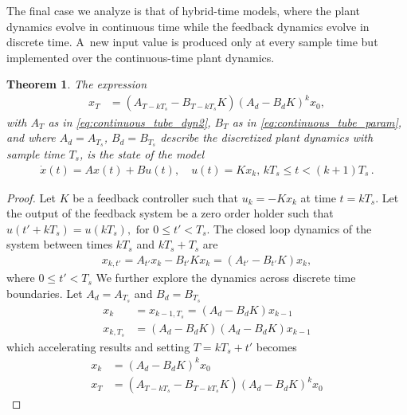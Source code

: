 \documentclass[twocolumn]{autart}    %
\newcommand{\mat}[1]{{#1}}
\renewcommand{\vec}[1]{{#1}}
\newtheorem{theorem}{Theorem}
\newtheorem{proof}{Proof}
\renewcommand{\note}[1]{\textcolor{red}{[#1]}}
\begin{document}
The final case we analyze is that of hybrid-time models, where the plant
dynamics evolve in continuous time while the feedback dynamics evolve in
discrete time.  A~new input value is produced only at every sample time but
implemented over the continuous-time plant dynamics.
%
\begin{theorem}
The expression
%
 \begin{align}
 \vec{x}_{T} &= (\mat{A}_{T-kT_s}-\mat{B}_{T-kT_s}\mat{K}) (\mat{A}_d-\mat{B}_d\mat{K})^k\vec{x}_0, 
 \label{eq:cyber_feedback}
 \end{align}
%
with $\mat{A}_T$ as in \eqref{eq:continuous_tube_dyn2}, $\mat{B}_T$ as in
\eqref{eq:continuous_tube_param}, and where $\mat{A}_d=\mat{A}_{T_s}$,
$\mat{B}_d=\mat{B}_{T_s}$ describe the discretized plant dynamics with
sample time $T_s$, is the state of the model
%
\begin{align*}
 \dot{\vec{x}}(t) = \mat{A}\vec{x}(t)+\mat{B}\vec{u}(t), \quad 
 \vec{u}(t)=\mat{K}\vec{x}_k,  \,
 kT_s \leq t < (k+1)T_s \,. 
\end{align*}
%
\end{theorem}
\begin{proof}
%
Let $\mat{K}$ be a feedback controller such that
$\vec{u}_k=-\mat{K}\vec{x}_k$ at time $t=kT_s$.  Let the output of the
feedback system be a zero order holder such that
$\vec{u}(t'+kT_s)=\vec{u}(kT_s), \text{ for } 0 \leq t' < T_s$.  The closed
loop dynamics of the system between times $kT_s$ and $kT_s+T_s$ are
%
\begin{align*}
\vec{x}_{k,t'}=\mat{A}_{t'}\vec{x}_k-\mat{B}_{t'}\mat{K}\vec{x}_k = (\mat{A}_{t'}-\mat{B}_{t'}\mat{K})\vec{x}_k,
\end{align*}
where $0 \leq t' < T_s$
We further explore the dynamics across discrete time boundaries. Let $\mat{A}_d=\mat{A}_{T_s}$ and $\mat{B}_d=\mat{B}_{T_s}$
\begin{align*}
\vec{x}_{k}&=\vec{x}_{k-1,T_s}= (\mat{A}_d-\mat{B}_d\mat{K})\vec{x}_{k-1}\\
\vec{x}_{k,T_s} &= (\mat{A}_d-\mat{B}_d\mat{K}) (\mat{A}_d-\mat{B}_d\mat{K})\vec{x}_{k-1}
\end{align*}
which accelerating results and setting $T=kT_s+t'$ becomes
\begin{align}
\label{eq:feedback_sampled_cont}
\vec{x}_{k} &= (\mat{A}_d-\mat{B}_d\mat{K}) ^k\vec{x}_0\\
\vec{x}_{T} &= (\mat{A}_{T-kT_s}-\mat{B}_{T-kT_s}\mat{K}) (\mat{A}_d-\mat{B}_d\mat{K})^k\vec{x}_0
\label{eq:feedback_cont}
\end{align}
\end{proof}
\end{document}
